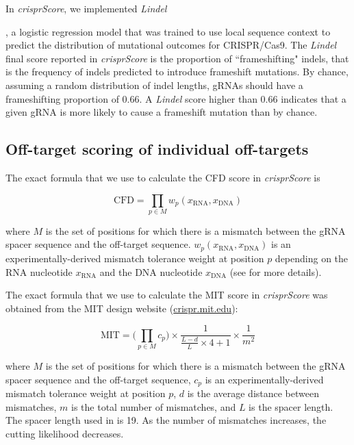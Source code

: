 \documentclass[pdftex,english,10pt]{article}
\begin{document}
In \textit{crisprScore}, we implemented \textit{Lindel} {\citep{lindel}, a logistic regression model that was trained to use local sequence context to predict the distribution of mutational outcomes for CRISPR/Cas9. The \textit{Lindel} final score reported in \textit{crisprScore} is the proportion of ``frameshifting" indels, that is the frequency of indels predicted to introduce frameshift mutations. By chance, assuming a random distribution of indel lengths, gRNAs should have a frameshifting proportion of 0.66. A \textit{Lindel} score higher than 0.66 indicates that a given gRNA is more likely to cause a frameshift mutation than by chance. 




\subsection*{Off-target scoring of individual off-targets}

The exact formula that we use to calculate the CFD score in \textit{crisprScore} is

\begin{equation}
\text{CFD} = \prod_{p \in M}{w_p}(x_{\text{RNA}},x_\text{DNA})
\end{equation}

where $M$ is the set of positions for which there is a mismatch between the gRNA spacer sequence and the off-target sequence.
$w_p(x_{\text{RNA}},x_\text{DNA})$ is an experimentally-derived mismatch tolerance weight at position $p$ depending on the RNA nucleotide $x_{\text{RNA}}$ and the DNA nucleotide $x_{\text{DNA}}$ (see \citet{doench2016optimized} for more details).


The exact formula that we use to calculate the MIT score in \textit{crisprScore} was obtained from the MIT design website (\url{crispr.mit.edu}):



\begin{equation}
\text{MIT} = \biggl(\prod_{p \in M}{c_p}\biggr)\times\frac{1}{\frac{L-d}{L}\times4+1}\times\frac{1}{m^2}
\end{equation}

where $M$ is the set of positions for which there is a mismatch between the gRNA spacer sequence and the off-target sequence, $c_p$ is an experimentally-derived mismatch tolerance weight at position $p$, $d$ is the average distance between mismatches, $m$ is the total number of mismatches, and $L$ is the spacer length.  The spacer length used in \citet{mit} is 19. As the number of mismatches increases, the cutting likelihood decreases. 

}
\end{document}
